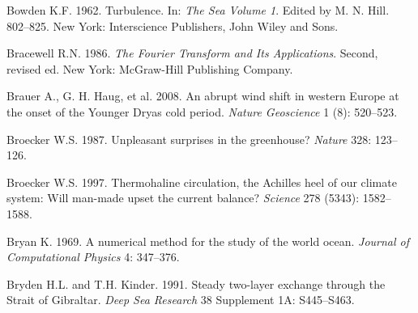 \begin{thebibliography}{999}
Bowden K.F.  1962. Turbulence. In: \textit{The Sea Volume 1}. Edited
by M. N.  Hill. 802--825. New York: Interscience Publishers, John
Wiley and Sons.
%

Bracewell R.N.  1986. \textit{The Fourier Transform and Its
  Applications}.  Second, revised ed.  New York: McGraw-Hill
Publishing Company.
%

Brauer A., G. H. Haug, et al.  2008. An abrupt wind shift in western
Europe at the onset of the Younger Dryas cold period. \textit{Nature
  Geoscience} 1 (8): 520--523.
%

Broecker W.S.  1987. Unpleasant surprises in the greenhouse?
\textit{Nature} 328: 123--126.
%

Broecker W.S.  1997. Thermohaline circulation, the Achilles heel of
our climate system: Will man-made \COtwo{} upset the current balance?
\textit{Science} 278 (5343): 1582--1588.
%

Bryan K.  1969. A numerical method for the study of the world ocean.
\textit{Journal of Computational Physics} 4: 347--376.
%

Bryden H.L. and T.H. Kinder.  1991. Steady two-layer exchange through
the Strait of Gibraltar. \textit{Deep Sea Research} 38 Supplement 1A:
S445--S463.
%


\end{thebibliography}
